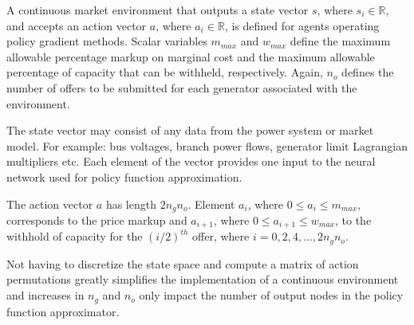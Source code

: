 
A continuous market environment that outputs a state vector $s$, where $s_i
\in \mathbb{R}$, and accepts an action vector $a$, where $a_i \in \mathbb{R}$,
is defined for agents operating policy gradient methods.  Scalar variables
$m_{max}$ and $w_{max}$ define the maximum allowable percentage markup on
marginal cost and the maximum allowable percentage of capacity that can be
withheld, respectively.  Again, $n_o$ defines the number of offers to be
submitted for each generator associated with the environment.

The state vector may consist of any data from the power system or market
model.  For example: bus voltages, branch power flows, generator limit
Lagrangian multipliers etc.  Each element of the vector provides one input to the neural network used for policy function approximation.

The action vector $a$ has length $2n_gn_o$.  Element $a_i$, where $0\leq a_i
\leq m_{max}$, corresponds to the price markup and $a_{i+1}$, where $0\leq
a_{i+1} \leq w_{max}$, to the withhold of capacity for the $(i/2)^{th}$ offer,
where $i=0,2,4,\dotsc,2n_gn_o$.

Not having to discretize the state space and compute a matrix of action
permutations greatly simplifies the implementation of a continuous environment
and increases in $n_g$ and $n_o$ only impact the number of output nodes
in the policy function approximator.

